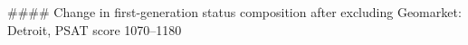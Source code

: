 #### Change in first-generation status composition after excluding Geomarket: Detroit, PSAT score 1070–1180
